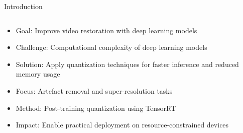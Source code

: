 \documentclass{beamer}
\begin{document}
\begin{frame}{Introduction}
\begin{figure}
\begin{columns}
  \end{columns}
\end{figure}

\begin{itemize}
  \item Goal: Improve video restoration with deep learning models
  \item Challenge: Computational complexity of deep learning models
  \item Solution: Apply quantization techniques for faster inference and reduced memory usage
\end{itemize}
\medskip
\begin{itemize}
  \item Focus: Artefact removal and super-resolution tasks
  \item Method: Post-training quantization using TensorRT
  \item Impact: Enable practical deployment on resource-constrained devices
\end{itemize}
\end{frame}
\end{document}
